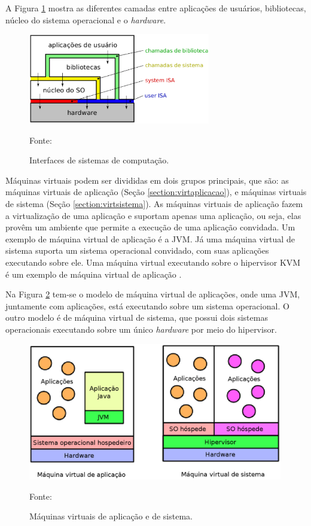 A Figura \ref{fig:interfaces_isa} mostra as diferentes camadas entre aplicações de usuários, bibliotecas, núcleo do sistema operacional e o 
\textit{hardware}.

\begin{figure}[h!]
 \centering
 \includegraphics[width=300px]{img/interfaces_isa.eps}
 \caption{Interfaces de sistemas de computação.}
 \label{fig:interfaces_isa}
 Fonte: \citet{maziero2013}
\end{figure}

Máquinas virtuais podem ser divididas em dois grupos principais, que são: as máquinas virtuais de aplicação (Seção \ref{section:virtaplicacao}), 
e máquinas virtuais de sistema (Seção \ref{section:virtsistema}). As máquinas virtuais de aplicação fazem a virtualização de uma aplicação e 
suportam apenas uma aplicação, ou seja, elas provêm um ambiente que permite a execução de uma aplicação convidada. Um exemplo de máquina 
virtual de aplicação é a \ac{JVM}. Já uma máquina virtual de sistema suporta um sistema operacional convidado, com suas aplicações executando 
sobre ele. Uma máquina virtual executando sobre o hipervisor \ac{KVM} é um exemplo de máquina virtual de aplicação \cite{laureano2008}.

Na Figura \ref{fig:vms_tipos} tem-se o modelo de máquina virtual de aplicações, onde uma \ac{JVM}, juntamente com aplicações, está executando 
sobre um sistema operacional. O outro modelo é de máquina virtual de sistema, que possui dois sistemas operacionais executando sobre um único 
\textit{hardware} por meio do hipervisor.

\begin{figure}[h!]
 \centering
 \includegraphics[width=420px]{img/vms_tipos.eps}
 \caption{Máquinas virtuais de aplicação e de sistema.}
 \label{fig:vms_tipos}
 Fonte: \citet{laureano2008}
\end{figure}

